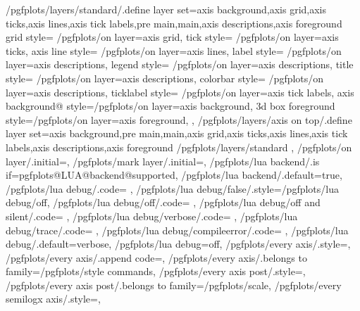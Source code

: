 {	/pgfplots/layers/standard/.define layer set={axis background,axis grid,axis ticks,axis lines,axis tick labels,pre main,main,axis descriptions,axis foreground}{
		grid style=			{/pgfplots/on layer=axis grid},
		tick style=			{/pgfplots/on layer=axis ticks},
		axis line style=	{/pgfplots/on layer=axis lines},
		label style=		{/pgfplots/on layer=axis descriptions},
		legend style=		{/pgfplots/on layer=axis descriptions},
		title style=		{/pgfplots/on layer=axis descriptions},
		colorbar style=		{/pgfplots/on layer=axis descriptions},
		ticklabel style=	{/pgfplots/on layer=axis tick labels},
		axis background@ style={/pgfplots/on layer=axis background},
		3d box foreground style={/pgfplots/on layer=axis foreground},
	},
	/pgfplots/layers/axis on top/.define layer set={axis background,pre main,main,axis grid,axis ticks,axis lines,axis tick labels,axis descriptions,axis foreground}{
		/pgfplots/layers/standard
	},
	/pgfplots/on layer/.initial=,
	/pgfplots/mark layer/.initial=,
	/pgfplots/lua backend/.is if=pgfplots@LUA@backend@supported,
	/pgfplots/lua backend/.default=true,
	/pgfplots/lua debug/.code={%
	},
	/pgfplots/lua debug/false/.style={/pgfplots/lua debug/off},%
	/pgfplots/lua debug/off/.code={%
		\def\pgfplots@LUA@backend@debugmode{off}%
		\def\pgfplots@LUA@loglevel@debug{5}%
		\def\pgfplots@LUA@loglevel@info{4}%
		\pgfplots@LUA@fail@on@TeX@fallbackfalse
	},
	/pgfplots/lua debug/off and silent/.code={%
		\def\pgfplots@LUA@backend@debugmode{off and silent}%
		\def\pgfplots@LUA@loglevel@debug{5}%
		\def\pgfplots@LUA@loglevel@info{5}%
		\pgfplots@LUA@fail@on@TeX@fallbackfalse
	},
	/pgfplots/lua debug/verbose/.code={%
		\def\pgfplots@LUA@backend@debugmode{verbose}%
		\def\pgfplots@LUA@loglevel@debug{4}%
		\def\pgfplots@LUA@loglevel@info{4}%
		\pgfplots@LUA@fail@on@TeX@fallbackfalse
	},
	/pgfplots/lua debug/trace/.code={%
		\let\pgfplotsutil@directlua=\pgfplotsutil@directlua@trace
	},%
	/pgfplots/lua debug/compileerror/.code={%
		\def\pgfplots@LUA@backend@debugmode{compileerror}%
		\def\pgfplots@LUA@loglevel@debug{4}%
		\def\pgfplots@LUA@loglevel@info{4}%
		\pgfplots@LUA@fail@on@TeX@fallbacktrue
	},
	/pgfplots/lua debug/.default=verbose,
	/pgfplots/lua debug=off,
	/pgfplots/every axis/.style={},
	/pgfplots/every axis/.append code={},
	/pgfplots/every axis/.belongs to family=/pgfplots/style commands,
	/pgfplots/every axis post/.style={},
	/pgfplots/every axis post/.belongs to family=/pgfplots/scale,
	/pgfplots/every semilogx axis/.style={},
}
